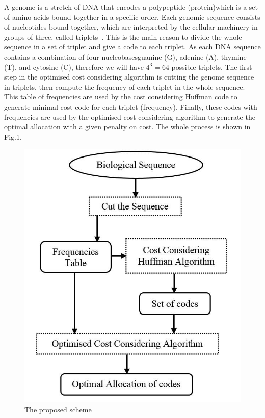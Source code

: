 \documentclass[preprint,12pt]{elsarticle}%
\begin{document}
A genome is a stretch of DNA that encodes  a polypeptide (protein)which is a set of amino acids bound together in a specific order. Each genomic sequence consists of nucleotides bound together, which are interpreted by the cellular machinery in groups of three, called triplets~\cite{Harvey00}. This is the main reason to divide the whole sequence in a set of triplet and give a code to each triplet. As each DNA sequence contains a combination of four nucleobases\textemdash guanine (G), adenine (A), thymine (T), and cytosine (C), therefore we will have $4^3=64$ possible triplets.  The first step in the optimised cost considering algorithm is cutting the genome sequence in triplets, then compute the frequency of each triplet in the whole sequence. This table of frequencies are used by the cost considering Huffman code to generate minimal cost code for each triplet (frequency). Finally, these codes with frequencies are used by the optimised cost considering algorithm to generate the optimal allocation with a given  penalty on cost. The whole process is shown in Fig.1.%

\begin{figure}[t]
\begin{center}
\includegraphics[scale=0.4]{Images/Drawing3_1.jpg}
\caption{The proposed scheme}
\end{center}
\label{Fig1}
\end{figure}
\end{document}
